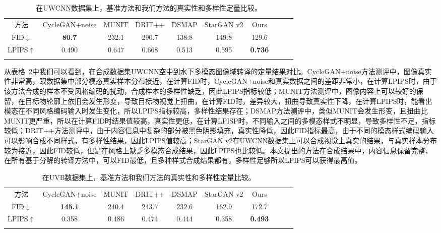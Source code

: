 \begin{table}[ht]
\centering
\caption{在UWCNN数据集上，基准方法和我们方法的真实性和多样性定量比较。}
  \begin{tabular}{c|ccccccccc}
    \hline\noalign{\smallskip}
    方法 & CycleGAN+noise & MUNIT & DRIT++ & DSMAP & StarGAN v2 & Ours \\
    \noalign{\smallskip}\hline\noalign{\smallskip}
    FID$\downarrow$ & \textbf{80.7} & 232.1 & 290.7 & 138.8 & 149.8 & 129.6          \\
    LPIPS$\uparrow$ & 0.490         & 0.647 & 0.668 & 0.513 & 0.595 & \textbf{0.736} \\
    \noalign{\smallskip}\hline
  \end{tabular}
  \label{tab:uwcnn_comparison}
\end{table}

从表格~\ref{tab:uvb_comparison}中我们可以看到，在合成数据集UWCNN空中到水下多模态图像域转译的定量结果对比。CycleGAN+noise方法测评中，图像真实性非常高，跟数据集中部分模态真实样本分布接近，在计算FID时，CycleGAN+noise和真实数据之间的差距非常小，在计算LPIPS时，由于该方法合成的样本不受风格编码的扰动，合成样本的多样性缺乏，因此LPIPS指标较低；MUNIT方法测评中，图像内容上可以较好的保 留，在目标物轮廓上依旧会发生形变，导致目标物视觉上扭曲，在计算FID时，差异较大，扭曲导致真实性下降，在计算LPIPS时，能看出模态在不同风格编码输入时发生变化，所以LPIPS指标较高，多样性结果存在；DSMAP方法测评中，类似MUNIT会发生形变，且扭曲比MUNIT更严重，所以在计算FID时结果值较高，真实性更低，在计算LPISP时，不同输入之间的多模态样式不明显，导致多样性不足，指标较低；DRIT++方法测评中，由于内容信息中复杂的部分被黑色阴影填充，真实性降低，因此FID指标最高，由于不同的模态样式编码输入可以影响合成不同样式，有多样性结果，因此LPIPS值较高；StarGAN v2在UWCNN数据集上可以合成视觉上真实的结果，与真实样本分布较为接近，因此FID较低，但是在风格上缺乏多模态合成结果，因此LPIPS也比较低。本文提出的方法在合成结果中，内容信息保留完整，在所有基于分解的转译方法中，可以FID最低，且多种样式合成结果都有，多样性足够所以LPIPS可以获得最高值。

\begin{table}[ht]
\centering
\caption{在UVB数据集上，基准方法和我们方法的真实性和多样性定量比较。}
  \begin{tabular}{c|ccccccccc}
    \hline\noalign{\smallskip}
    方法 & CycleGAN+noise & MUNIT & DRIT++ & DSMAP & StarGAN v2 & Ours \\
    \noalign{\smallskip}\hline\noalign{\smallskip}
    FID$\downarrow$ & \textbf{145.1} & 240.4 & 243.7 & 232.6 & 162.9 & 172.7          \\
    LPIPS$\uparrow$ & 0.358          & 0.486 & 0.474 & 0.444 & 0.358 & \textbf{0.493} \\
    \noalign{\smallskip}\hline
  \end{tabular}
  \label{tab:uvb_comparison}
\end{table}

